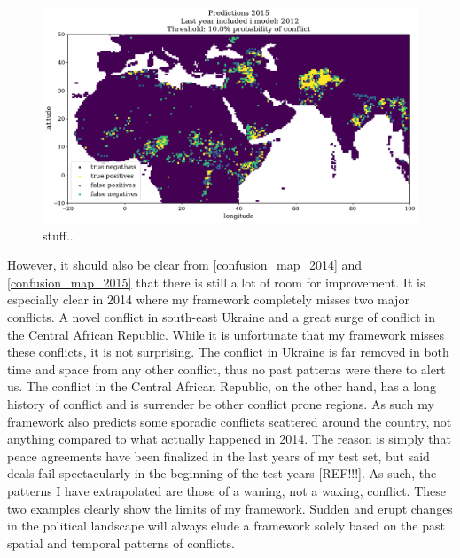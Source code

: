 \documentclass[a4paper]{article}
\begin{document}
\begin{figure}[!htb]
	\centering
	\includegraphics[scale=0.47]{confusion_map_2015.pdf}
    \caption{\footnotesize{stuff..}}\label{confusion_map_2015}
\end{figure}

However, it should also be clear from \autoref{confusion_map_2014} and \autoref{confusion_map_2015} that there is still a lot of room for improvement. It is especially clear in 2014 where my framework completely misses two major conflicts. A novel conflict in south-east Ukraine and a great surge of conflict in the Central African Republic. While it is unfortunate that my framework misses these conflicts, it is not surprising. The conflict in Ukraine is far removed in both time and space from any other conflict, thus no past patterns were there to alert us. The conflict in the Central African Republic, on the other hand, has a long history of conflict and is surrender be other conflict prone regions. As such my framework also predicts some sporadic conflicts scattered around the country, not anything compared to what actually happened in 2014. The reason is simply that peace agreements have been finalized in the last years of my test set, but said deals fail spectacularly in the beginning of the test years [REF!!!]. As such, the patterns I have extrapolated are those of a waning, not a waxing, conflict. These two examples clearly show the limits of my framework. Sudden and erupt changes in the political landscape will always elude a framework solely based on the past spatial and temporal patterns of conflicts.\par
\end{document}
